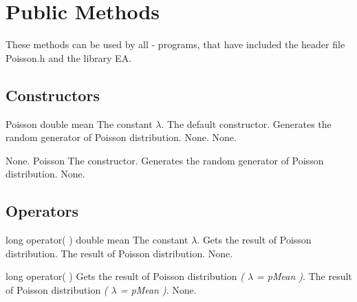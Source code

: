\section{Public Methods}

\noindent
These methods can be used by all \cpp - programs, that have included the
header file Poisson.h and the library EA.

\subsection{Constructors}

\setNormalInstance
\printMethodWithOneParam
{}
{Poisson}
{double}
{mean}
{The constant $\lambda$.}
{The default constructor. Generates the random generator of Poisson distribution.}
{None.}
{None.}

\setNormalInstance
\setCorrectWidthThree{8pt}
\printMethodWithParamsSaved
{}
{None.}
{Poisson}
{The constructor. Generates the random generator of Poisson distribution.}
{None.}
\setCorrectWidthThree{4pt}

\vspace*{10mm}

\subsection{Operators}

\setNormalInstance
\printMethodWithOneParam
{long}
{operator( )}
{double}
{mean}
{The constant $\lambda$.}
{Gets the result of Poisson distribution.}
{The result of Poisson distribution.}
{None.}

\clearpage

\setNormalInstance
\printEmptyMethodReturnSpecial
{long}
{operator( )}
{Gets the result of Poisson distribution {\em ( $\lambda$ = pMean )}.}
{The result of Poisson distribution {\em ( $\lambda$ = pMean )}.}
{None.}

